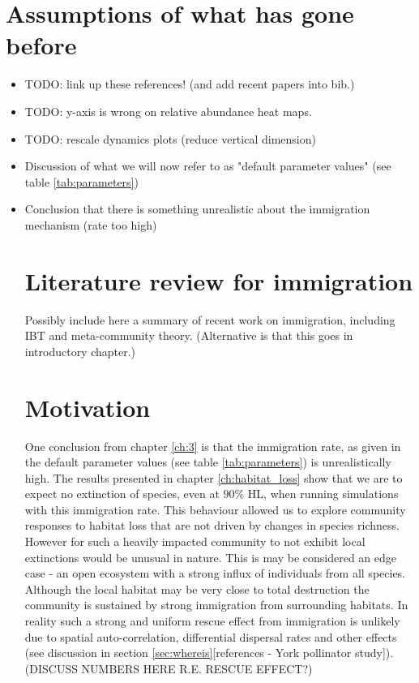 \section{Assumptions of what has gone before}

\begin{itemize}
	\item TODO: link up these references! (and add recent papers into bib.)
	\item TODO: y-axis is wrong on relative abundance heat maps.	
	\item TODO: rescale dynamics plots (reduce vertical dimension)
	\item Discussion of what we will now refer to as "default parameter values" (see table \ref{tab:parameters})
	\item Conclusion that there is something unrealistic about the immigration mechanism (rate too high)
	
\cite{ripple2012trophic}

\section{Literature review for immigration}

Possibly include here a summary of recent work on immigration, including IBT and meta-community theory. (Alternative is that this goes in introductory chapter.) 

\section{Motivation}
\label{sec:motivate_immigration}

One conclusion from chapter \ref{ch:3} is that the immigration rate, as given in the default parameter values (see table \ref{tab:parameters}) is unrealistically high. The results presented in chapter \ref{ch:habitat_loss} show that we are to expect no extinction of species, even at $90\%$ HL, when running simulations with this immigration rate. This behaviour allowed us to explore community responses to habitat loss that are not driven by changes in species richness. However for such a heavily impacted community to not exhibit local extinctions would be unusual in nature. This is may be considered an edge case - an open ecosystem with a strong influx of individuals from all species. Although the local habitat may be very close to total destruction the community is sustained by strong immigration from surrounding habitats. In reality such a strong and uniform rescue effect from immigration is unlikely due to spatial auto-correlation, differential dispersal rates and other effects (see discussion in section \ref{sec:whereis}[references - York pollinator study]).  (DISCUSS NUMBERS HERE R.E. RESCUE EFFECT?)
  

\end{itemize}
